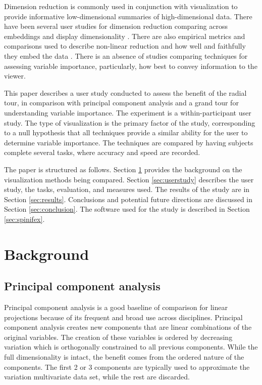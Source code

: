 \documentclass{template/monashthesis}
\begin{document}
Dimension reduction is commonly used in conjunction with visualization to provide informative low-dimensional summaries of high-dimensional data. There have been several user studies
for dimension reduction comparing across embeddings and display dimensionality \autocite{gracia_new_2016,wagner_filho_immersive_2018}. There are also empirical metrics and comparisons used to describe non-linear reduction and how well and faithfully they embed the data \autocite{bertini_quality_2011,liu_visualizing_2017,sedlmair_empirical_2013,van_der_maaten_visualizing_2008}. There is an absence of studies comparing techniques for assessing variable importance, particularly, how best to convey information to the viewer.

This paper describes a user study conducted to assess the benefit of the radial tour, in comparison with principal component analysis and a grand tour for understanding variable importance. The experiment is a within-participant user study. The type of visualization is the primary factor of the study, corresponding to a null hypothesis that all techniques provide a similar ability for the user to determine variable importance. The techniques are compared by having subjects complete several tasks, where accuracy and speed are recorded.

The paper is structured as follows. Section \ref{sec:background} provides the background on the visualization methods being compared. Section \ref{sec:userstudy} describes the user study, the tasks, evaluation, and measures used. The results of the study are in Section \ref{sec:results}. Conclusions and potential future directions are discussed in Section \ref{sec:conclusion}. The software used for the study is described in Section \ref{sec:spinifex}.

\hypertarget{sec:background}{%
\section{Background}\label{sec:background}}

\hypertarget{principal-component-analysis}{%
\subsection{Principal component analysis}\label{principal-component-analysis}}

Principal component analysis is a good baseline of comparison for linear projections because of its frequent and broad use across disciplines. Principal component analysis \autocite[PCA,][]{pearson_liii._1901} creates new components that are linear combinations of the original variables. The creation of these variables is ordered by decreasing variation which is orthogonally constrained to all previous components. While the full dimensionality is intact, the benefit comes from the ordered nature of the components. The first 2 or 3 components are typically used to approximate the variation multivariate data set, while the rest are discarded.
\end{document}
